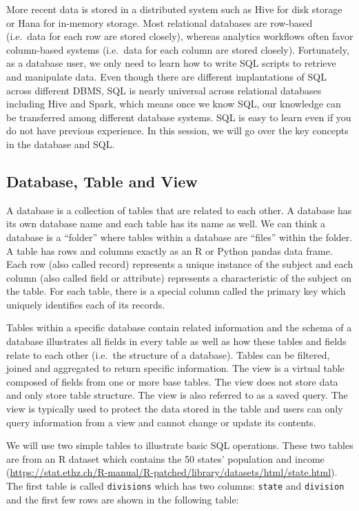 \documentclass[12pt,]{krantz}
\begin{document}
More recent data is stored in a distributed system such as Hive for disk storage or Hana for in-memory storage. Most relational databases are row-based (i.e.~data for each row are stored closely), whereas analytics workflows often favor column-based systems (i.e.~data for each column are stored closely). Fortunately, as a database user, we only need to learn how to write SQL scripts to retrieve and manipulate data. Even though there are different implantations of SQL across different DBMS, SQL is nearly universal across relational databases including Hive and Spark, which means once we know SQL, our knowledge can be transferred among different database systems. SQL is easy to learn even if you do not have previous experience. In this session, we will go over the key concepts in the database and SQL.

\hypertarget{database-table-and-view}{%
\subsection{Database, Table and View}\label{database-table-and-view}}

A database is a collection of tables that are related to each other. A database has its own database name and each table has its name as well. We can think a database is a ``folder'' where tables within a database are ``files'' within the folder. A table has rows and columns exactly as an R or Python pandas data frame. Each row (also called record) represents a unique instance of the subject and each column (also called field or attribute) represents a characteristic of the subject on the table. For each table, there is a special column called the primary key which uniquely identifies each of its records.

Tables within a specific database contain related information and the schema of a database illustrates all fields in every table as well as how these tables and fields relate to each other (i.e.~the structure of a database). Tables can be filtered, joined and aggregated to return specific information. The view is a virtual table composed of fields from one or more base tables. The view does not store data and only store table structure. The view is also referred to as a saved query. The view is typically used to protect the data stored in the table and users can only query information from a view and cannot change or update its contents.

We will use two simple tables to illustrate basic SQL operations. These two tables are from an R dataset which contains the 50 states' population and income (\url{https://stat.ethz.ch/R-manual/R-patched/library/datasets/html/state.html}). The first table is called \texttt{divisions} which has two columns: \texttt{state} and \texttt{division} and the first few rows are shown in the following table:
\end{document}
